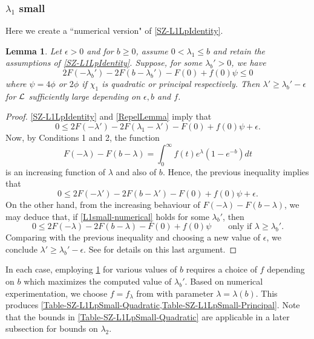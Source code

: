 \documentclass[12pt,psamsfonts]{amsart}
\newtheorem{lem}[thm]{Lemma}
\theoremstyle{definition}
\theoremstyle{remark}
\numberwithin{equation}{section}
\begin{document}
\subsubsection{$\lambda_1$ small} 

Here we create a  ``numerical version" of \cref{SZ-L1LpIdentity}. 
\begin{lem} \label{SZ-L1Lpsmall} Let $\epsilon > 0$ and for $b \geq 0$, assume $0 < \lambda_1 \leq b$ and retain the assumptions of \cref{SZ-L1LpIdentity}. Suppose, for some $\lambda_b' > 0$, we have 
\begin{equation}
2F(-\lambda_b') - 2F(b-\lambda_b') - F(0) +   f(0) \psi  \leq 0
\label{L1small-numerical}
\end{equation}
where $\psi = 4\phi$ or $2\phi$ if $\chi_1$ is quadratic or principal respectively. Then $\lambda' \geq \lambda_b' - \epsilon$ for $\mathcal{L}$ sufficiently large depending on $\epsilon, b$ and $f$. 
\end{lem}
\begin{proof}
\cref{SZ-L1LpIdentity} and \cref{RepelLemma} imply that
\[
0 \leq 2F(-\lambda') - 2F(\lambda_1-\lambda') - F(0) + f(0)\psi+\epsilon.
\]
Now, by Conditions 1 and 2, the function
\[
F(-\lambda) - F(b-\lambda) = \int_0^{\infty} f(t) e^{\lambda} (1-e^{-b}) dt
\]
is an increasing function of $\lambda$ and also of $b$. Hence, the previous inequality implies that 
\[
0 \leq 2F(-\lambda') - 2F(b-\lambda') - F(0) + f(0)\psi+\epsilon.
\]
On the other hand, from the increasing behaviour of $F(-\lambda) - F(b-\lambda)$, we may deduce that, if \eqref{L1small-numerical} holds for some $\lambda_b'$, then
\[
0 \leq 2F(-\lambda) - 2F(b-\lambda) - F(0) + f(0) \psi \qquad \text{only if $\lambda \geq \lambda_b'$.}
\]
Comparing with the previous inequality and choosing a new value of $\epsilon$, we conclude $\lambda' \geq \lambda_b' - \epsilon$. See \cite[p.773]{KadNg} for details on this last argument. 
\end{proof}

 In each case, employing \cref{SZ-L1Lpsmall}  for various values of $b$ requires a choice of $f$ depending on $b$ which maximizes the computed value of $\lambda_b'$. Based on numerical experimentation, we choose $f = f_{\lambda}$ from  \cite[Lemma 7.2]{HBLinnik} with parameter $\lambda = \lambda(b)$. This produces \cref{Table-SZ-L1LpSmall-Quadratic,Table-SZ-L1LpSmall-Principal}. Note that the bounds in \cref{Table-SZ-L1LpSmall-Quadratic} are applicable in a later subsection for bounds on $\lambda_2$.
\end{document}

